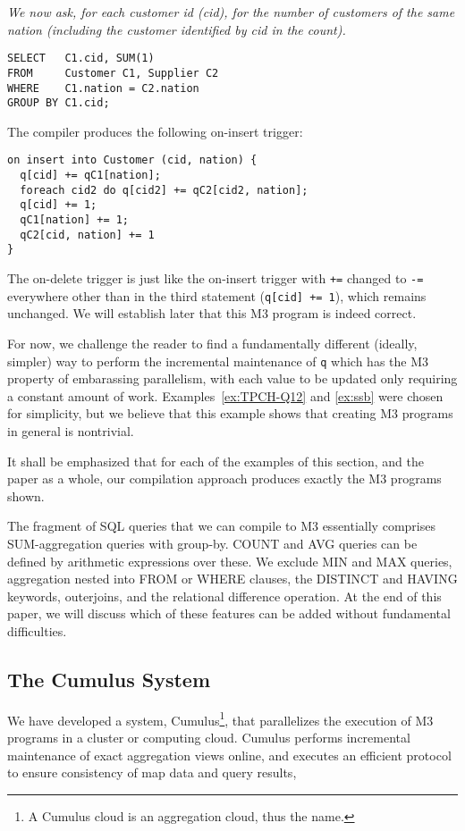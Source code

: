 \begin{example}\em
\label{ex:self-join}
We now ask, for each customer id (cid),
for the number of customers of the same nation (including the customer
identified by cid in the count).
\begin{verbatim}
SELECT   C1.cid, SUM(1)
FROM     Customer C1, Supplier C2
WHERE    C1.nation = C2.nation
GROUP BY C1.cid;
\end{verbatim}
The compiler produces the following on-insert trigger:
\begin{verbatim}
on insert into Customer (cid, nation) {
  q[cid] += qC1[nation];
  foreach cid2 do q[cid2] += qC2[cid2, nation];
  q[cid] += 1;
  qC1[nation] += 1;
  qC2[cid, nation] += 1
}
\end{verbatim}
The on-delete trigger is just like the on-insert trigger with {\tt +=}
changed to {\tt -=} everywhere other than in the third statement
({\tt q[cid] += 1}), which remains unchanged.
We will establish later that this M3 program is indeed correct.

For now, we challenge the reader to find a 
fundamentally different (ideally, simpler) way to
perform the incremental maintenance of {\tt q}
which has the M3 property of embarassing parallelism, with each value
to be updated only requiring a constant amount of work.
Examples~\ref{ex:TPCH-Q12} and \ref{ex:ssb} were chosen for simplicity,
but we believe that this example shows that creating M3 programs in general
is nontrivial.
\punto
\end{example}


It shall be emphasized that for each of the examples of this section,
and the paper as a whole, our compilation approach produces exactly
the M3 programs shown.


The fragment of SQL queries that we can compile to M3 essentially comprises
SUM-agg\-regation queries with group-by.
COUNT and AVG queries can be defined by arithmetic expressions over these.
We exclude MIN and MAX queries, aggregation
nested into FROM or WHERE clauses, the DISTINCT and HAVING keywords,
outerjoins,
and the relational difference operation. At the end of this paper, we will
discuss which of these features can be added without fundamental difficulties.


\subsection{The Cumulus System}


We have developed a system, Cumulus\footnote{A Cumulus cloud is an
aggregation cloud, thus the name.}, that parallelizes the
execution of M3 programs in a cluster or computing cloud.
Cumulus performs incremental maintenance of exact aggregation views online, and
executes an efficient
protocol to ensure consistency of map data and query results,

